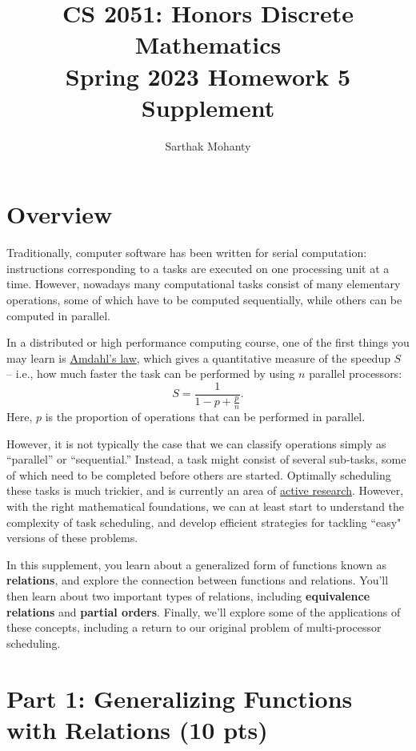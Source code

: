 \documentclass{article}
\title{\vspace{-1cm}CS 2051: Honors Discrete Mathematics \\Spring 2023 Homework 5 Supplement}
\author{Sarthak Mohanty }
\date{}
\begin{document}
\maketitle

\section*{Overview}

   \qquad Traditionally, computer software has been written for serial computation: instructions corresponding to a tasks are executed on one processing unit at a time. However, nowadays many computational tasks consist of many elementary operations, some of which have to be computed sequentially, while others can be computed in parallel.

    \vspace{2mm}
    \qquad In a distributed or high performance computing course, one of the first things you may learn is \href{https://en.wikipedia.org/wiki/Amdahls_law}{Amdahl’s law}, which gives a quantitative measure of the speedup $S$ -- i.e., how much faster the task can be performed by using $n$ parallel processors: $$S = \frac{1}{1 - p + \frac{p}{n}}.$$ Here, $p$ is the proportion of operations that can be performed in parallel.


    \vspace{2mm}
    \qquad However, it is not typically the case that we can classify operations simply as “parallel” or “sequential.” Instead, a task might consist of several sub-tasks, some of which need to be completed before others are started. Optimally scheduling these tasks is much trickier, and is currently an area of \href{https://www.cs.umd.edu/~samir/DCscheduling18/slides/Janardhan Kulkarni.pdf}{active research}. However, with the right mathematical foundations, we can at least start to understand the complexity of task scheduling, and develop efficient strategies for tackling ``easy" versions of these problems.

    \vspace{2mm}
    \qquad In this supplement, you learn about a generalized form of functions known as \textbf{relations}, and explore the connection between functions and relations. You'll then learn about two important types of relations, including \textbf{equivalence relations} and \textbf{partial orders}. Finally, we'll explore some of the applications of these concepts, including a return to our original problem of multi-processor scheduling.

\section*{Part 1: Generalizing Functions with Relations (10 pts)}
\end{document}
